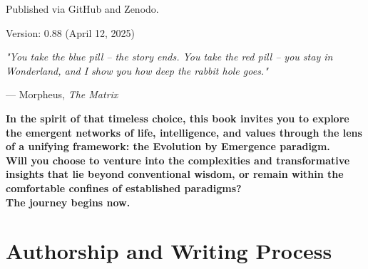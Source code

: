 \documentclass[12pt,openany]{book}
\let\cleardoublepage\clearpage %
\begin{document}
\bigskip %

\noindent %
Published via GitHub and Zenodo.

\bigskip

\noindent %
Version: 0.88 (April 12, 2025) %


\vfill %
\cleardoublepage %

\thispagestyle{empty} %
\epigraph{
    \textit{"You take the blue pill – the story ends. You take the red pill – you stay in Wonderland, and I show you how deep the rabbit hole goes."}
}{
    --- Morpheus, \textit{The Matrix}
}

\vspace{1cm}

\begin{center}
\textbf{\Large In the spirit of that timeless choice, this book invites you to explore the emergent networks of life, intelligence, and values through the lens of a unifying framework: the Evolution by Emergence paradigm.\\[0.5em] Will you choose to venture into the complexities and transformative insights that lie beyond conventional wisdom, or remain within the comfortable confines of established paradigms?\\[1em] The journey begins now.} %
\end{center}
\cleardoublepage %

\frontmatter %
\maketitle %
\tableofcontents
\cleardoublepage

\mainmatter %

\chapter*{Authorship and Writing Process}
\end{document}

